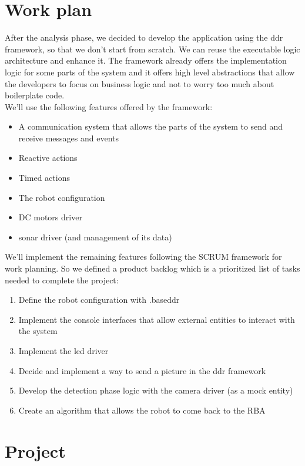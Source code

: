\documentclass{llncs}
\newcommand{\labelsec}[1]{\label{sec:#1}}
\begin{document}
\section{Work plan}
\labelsec{wplan}
After the analysis phase, we decided to develop the application using the ddr framework, so that we don't start from scratch. We can reuse the executable logic architecture and enhance it. The framework already offers the implementation logic for some parts of the system and it offers high level abstractions that allow the developers to focus on business logic and not to worry too much about boilerplate code.\\
We'll use the following features offered by the framework:
\begin{itemize}
\item A communication system that allows the parts of the system to send and receive messages and events
\item Reactive actions
\item Timed actions
\item The robot configuration
\item DC motors driver
\item sonar driver (and management of its data)
\end{itemize}
We'll implement the remaining features following the SCRUM framework for work planning. So we defined a product backlog which is a prioritized list of tasks needed to complete the project:
\begin{enumerate}
\item Define the robot configuration with .baseddr
\item Implement the console interfaces that allow external entities to interact with the system
\item Implement the led driver
\item Decide and implement a way to send a picture in the ddr framework
\item Develop the detection phase logic with the camera driver (as a mock entity)
\item Create an algorithm that allows the robot to come back to the RBA
\end{enumerate}

\section{Project}
\labelsec{Project}
\end{document}
